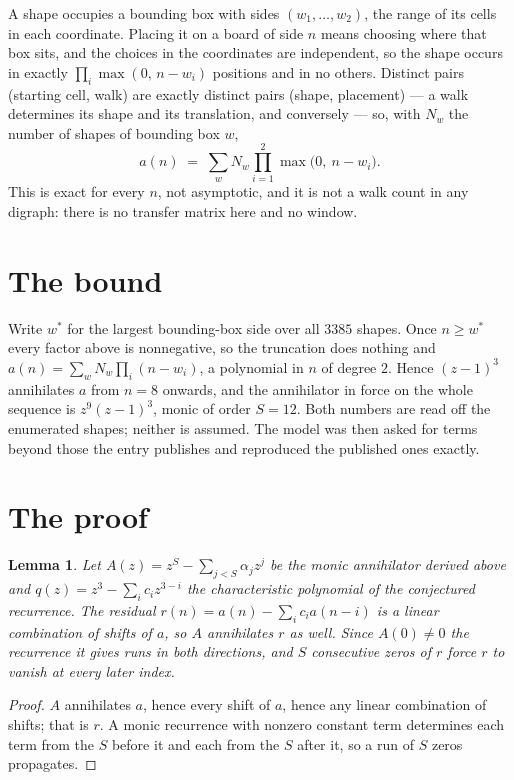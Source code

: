 \documentclass[11pt,a4paper]{article}
\theoremstyle{plain}
\newtheorem{lemma}[theorem]{Lemma}
\theoremstyle{definition}
\begin{document}
A shape occupies a bounding box with sides $(w_1,\dots,w_{2})$, the range of its cells in each
coordinate. Placing it on a board of side $n$ means choosing where that box sits, and the
choices in the coordinates are independent, so the shape occurs in exactly
$\prod_{i}\max(0,\,n-w_i)$ positions and in no others. Distinct pairs (starting cell,
walk) are exactly distinct pairs (shape, placement) --- a walk determines its shape and its
translation, and conversely --- so, with $N_w$ the number of shapes of bounding box $w$,
\[
a(n)\;=\;\sum_{w} N_w \prod_{i=1}^{2}\max\bigl(0,\ n-w_i\bigr).
\]
This is exact for every $n$, not asymptotic, and it is not a walk count in any digraph: there is
no transfer matrix here and no window.

\section{The bound}

Write $w^\ast$ for the largest bounding-box side over all $3385$ shapes. Once $n\ge w^\ast$
every factor above is nonnegative, so the truncation does nothing and
$a(n)=\sum_w N_w\prod_i(n-w_i)$, a polynomial in $n$ of degree $2$. Hence $(z-1)^{3}$
annihilates $a$ from $n=8$ onwards, and the annihilator in force on the whole sequence is
$z^{9}(z-1)^{3}$, monic of order $S=12$. Both numbers are read off the enumerated
shapes; neither is assumed. The model was then asked for terms beyond those the entry publishes
and reproduced the published ones exactly.

\section{The proof}

\begin{lemma}\label{lem:crit}
Let $A(z)=z^S-\sum_{j<S}\alpha_jz^{j}$ be the monic annihilator derived above and
$q(z)=z^{3}-\sum_ic_iz^{3-i}$ the characteristic polynomial of the conjectured
recurrence. The residual $r(n)=a(n)-\sum_ic_ia(n-i)$ is a linear combination of shifts of $a$,
so $A$ annihilates $r$ as well. Since $A(0)\ne0$ the recurrence it gives runs in both
directions, and $S$ consecutive zeros of $r$ force $r$ to vanish at every later index.
\end{lemma}

\begin{proof}
$A$ annihilates $a$, hence every shift of $a$, hence any linear combination of shifts; that is
$r$. A monic recurrence with nonzero constant term determines each term from the $S$ before it
and each from the $S$ after it, so a run of $S$ zeros propagates.
\end{proof}
\end{document}
